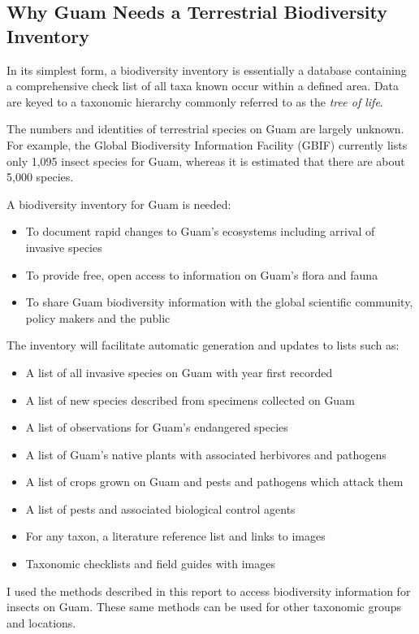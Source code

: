 \documentclass[12pt,letterpaper,english,bibliography=totocnumbered, abstract=on]{scrartcl}
\begin{document}
\subsection{Why Guam Needs a Terrestrial Biodiversity Inventory}

In its simplest form, a biodiversity inventory is essentially a database containing a comprehensive check list of all taxa known occur within a defined area. Data are keyed to a taxonomic hierarchy commonly referred to as the \textit{tree of life}. 

The numbers and identities of terrestrial species on Guam are largely unknown. For example, the Global Biodiversity Information Facility (GBIF) currently lists only 1,095 insect species for Guam, whereas it is estimated that there are about 5,000 species.

A biodiversity inventory for Guam is needed:

\begin{itemize}
	\item To document rapid changes to Guam’s ecosystems including arrival of invasive species
	\item To provide free, open access to information on Guam’s flora and fauna
	\item To share Guam biodiversity information with the global scientific community, policy makers and the public
\end{itemize}

The inventory will facilitate automatic generation and updates to lists such as:
\begin{itemize}
	\item A list of all invasive species on Guam with year first recorded
	\item A list of new species described from specimens collected on Guam
	\item A list of observations for Guam’s endangered species
	\item A list of Guam’s native plants with associated herbivores and pathogens
	\item A list of crops grown on Guam and pests and pathogens which attack them
	\item A list of pests and associated biological control agents
	\item For any taxon, a literature reference list and links to images
	\item Taxonomic checklists and field guides with images
\end{itemize}

I used the methods described in this report to access biodiversity information for insects on Guam. These same methods can be used for other taxonomic groups and locations.
\end{document}
